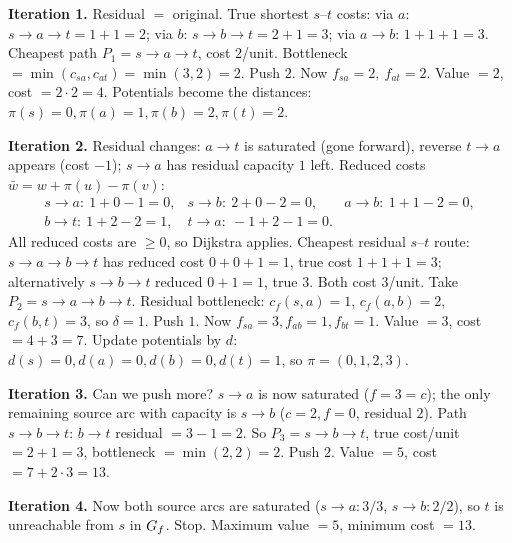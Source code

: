 \textbf{Iteration 1.} Residual $=$ original. True shortest $s$--$t$ costs: via $a$: $s\!\to\!a\!\to\!t=1+1=2$; via $b$: $s\!\to\!b\!\to\!t=2+1=3$; via $a\!\to\!b$: $1+1+1=3$. Cheapest path $P_1=s\!\to\!a\!\to\!t$, cost $2$/unit. Bottleneck $=\min(c_{sa},c_{at})=\min(3,2)=2$. Push $2$. Now $f_{sa}=2,\ f_{at}=2$. Value $=2$, cost $=2\cdot 2 = 4$. Potentials become the distances: $\pi(s)=0,\pi(a)=1,\pi(b)=2,\pi(t)=2$.

\textbf{Iteration 2.} Residual changes: $a\!\to\!t$ is saturated (gone forward), reverse $t\!\to\!a$ appears (cost $-1$); $s\!\to\!a$ has residual capacity $1$ left. Reduced costs $\bar w=w+\pi(u)-\pi(v)$:
\[
\begin{array}{lll}
 s\!\to\!a:\ 1+0-1=0, & s\!\to\!b:\ 2+0-2=0, & a\!\to\!b:\ 1+1-2=0,\\
 b\!\to\!t:\ 1+2-2=1, & t\!\to\!a:\ -1+2-1=0. &
\end{array}
\]
All reduced costs are $\ge 0$, so Dijkstra applies. Cheapest residual $s$--$t$ route: $s\!\to\!a\!\to\!b\!\to\!t$ has reduced cost $0+0+1=1$, true cost $1+1+1=3$; alternatively $s\!\to\!b\!\to\!t$ reduced $0+1=1$, true $3$. Both cost $3$/unit. Take $P_2=s\!\to\!a\!\to\!b\!\to\!t$. Residual bottleneck: $c_f(s,a)=1$, $c_f(a,b)=2$, $c_f(b,t)=3$, so $\delta=1$. Push $1$. Now $f_{sa}=3,f_{ab}=1,f_{bt}=1$. Value $=3$, cost $=4+3=7$. Update potentials by $d$: $d(s)=0,d(a)=0,d(b)=0,d(t)=1$, so $\pi=(0,1,2,3)$.

\textbf{Iteration 3.} Can we push more? $s\!\to\!a$ is now saturated ($f=3=c$); the only remaining source arc with capacity is $s\!\to\!b$ ($c=2,f=0$, residual $2$). Path $s\!\to\!b\!\to\!t$: $b\!\to\!t$ residual $=3-1=2$. So $P_3=s\!\to\!b\!\to\!t$, true cost/unit $=2+1=3$, bottleneck $=\min(2,2)=2$. Push $2$. Value $=5$, cost $=7+2\cdot 3=13$.

\textbf{Iteration 4.} Now both source arcs are saturated ($s\!\to\!a:3/3$, $s\!\to\!b:2/2$), so $t$ is unreachable from $s$ in $G_f$. Stop. Maximum value $=5$, minimum cost $=13$.

